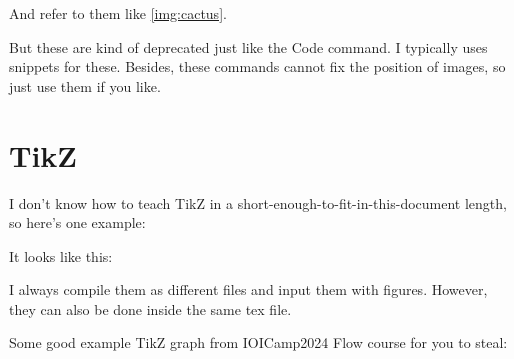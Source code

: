 \documentclass{fhw}
\begin{document}
And refer to them like \cref{img:cactus}.

But these are kind of deprecated just like the Code command.
I typically uses snippets for these.
Besides, these commands cannot fix the position of images,
so just use them if you like.

\section{TikZ}

I don't know how to teach TikZ in a short-enough-to-fit-in-this-document length, so here's one example:


It looks like this:


I always compile them as different files and input them with figures. However, they can also be done inside the same tex file.

Some good example TikZ graph from IOICamp2024 Flow course for you to steal:
\end{document}
